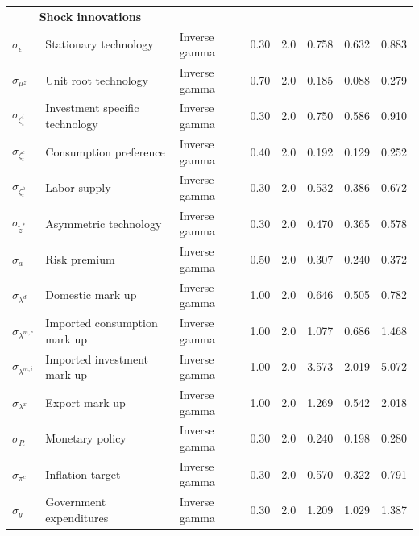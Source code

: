 \documentclass[12pt,oneside,a4paper]{article}
\begin{document}
\begin{table}[H]
\begin{tabular}{llllllll}
\multicolumn{2}{c}{\textbf{Shock innovations}}           &                 &         &        &         &           &        \\
$\sigma_{\epsilon}$   & Stationary technology                  & Inverse gamma   & 0.30    & 2.0    & 0.758  & 0.632    & 0.883 \\
$\sigma_{\mu^{z}}$       & Unit root technology                   & Inverse gamma   & 0.70    & 2.0    & 0.185  & 0.088    & 0.279 \\
$\sigma_{\zeta_{t}^{i}}$         & Investment specific technology         & Inverse gamma   & 0.30    & 2.0    & 0.750  & 0.586    & 0.910 \\
$\sigma_{\zeta_{t}^{c}}$         & Consumption preference                 & Inverse gamma   & 0.40    & 2.0    & 0.192  & 0.129    & 0.252 \\
$\sigma_{\zeta_{t}^{h}}$         & Labor supply                           & Inverse gamma   & 0.30    & 2.0    & 0.532  & 0.386    & 0.672 \\
$\sigma_{\tilde{z}^{*}}$       & Asymmetric technology                  & Inverse gamma   & 0.30    & 2.0    & 0.470  & 0.365    & 0.578 \\
$\sigma_{a}$         & Risk premium                           & Inverse gamma   & 0.50    & 2.0    & 0.307  & 0.240    & 0.372 \\
$\sigma_{\lambda^{d}}$   & Domestic mark up                       & Inverse gamma   & 1.00    & 2.0    & 0.646  & 0.505    & 0.782 \\
$\sigma_{\lambda^{m,c}}$  & Imported consumption mark up           & Inverse gamma   & 1.00    & 2.0    & 1.077  & 0.686 & 1.468 \\
$\sigma_{\lambda^{m,i}}$  & Imported investment mark up            & Inverse gamma   & 1.00    & 2.0    & 3.573  & 2.019    & 5.072 \\
$\sigma_{\lambda^{x}}$   & Export mark up                         & Inverse gamma   & 1.00    & 2.0    & 1.269  & 0.542    & 2.018 \\
$\sigma_{R}$         & Monetary policy                        & Inverse gamma   & 0.30    & 2.0    & 0.240  & 0.198    & 0.280 \\
$\sigma_{\pi^{c}}$       & Inflation target                       & Inverse gamma   & 0.30    & 2.0    & 0.570  & 0.322    & 0.791 \\
$\sigma_{g}$         & Government expenditures                 & Inverse gamma   & 0.30    & 2.0    & 1.209  & 1.029    & 1.387 \\
\hline
\end{tabular}
\end{table}
\end{document}
